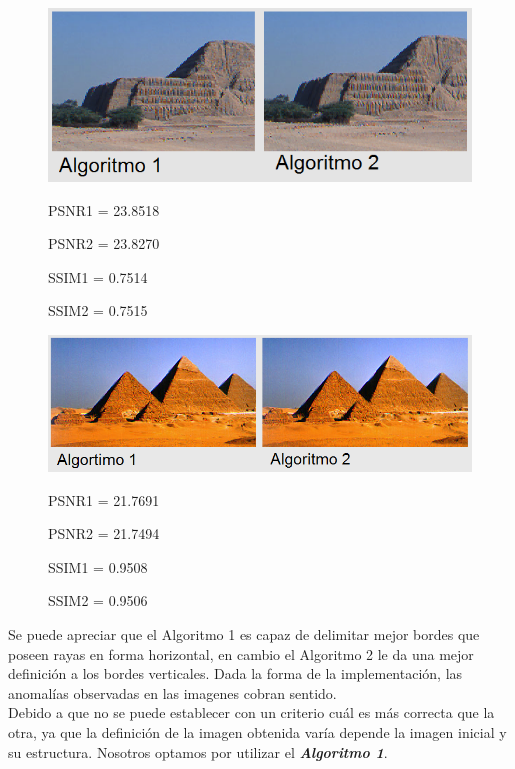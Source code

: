 \documentclass[a4paper]{article}
\begin{document}
\begin{figure}[h!]
	\caption{}
	\begin{center}
	\includegraphics[scale=0.06]{imagenes/Vecino/piramides3cmp}
	\label{Zebra}
	
	PSNR1 =   23.8518

PSNR2 =   23.8270

SSIM1 =    0.7514

SSIM2 =    0.7515
  \end{center}
\end{figure}

\begin{figure}[h!]
	\caption{}
	\begin{center}
	\includegraphics[scale=0.70]{imagenes/Vecino/piramides2cmp}
	\label{Zebra}
	
PSNR1 =   21.7691

PSNR2 =   21.7494

SSIM1 =    0.9508

SSIM2 =    0.9506
  \end{center}
\end{figure}




Se puede apreciar que el Algoritmo 1 es capaz de delimitar mejor bordes que poseen rayas en forma horizontal, en cambio el Algoritmo 2 le da una mejor definici\'on a los bordes verticales. Dada la forma de la implementaci\'on, las anomal\'ias observadas en las imagenes cobran sentido.\\


Debido a que no se puede establecer con un criterio cu\'al es m\'as correcta que la otra, ya que la definición de la imagen obtenida var\'ia depende la imagen inicial y su estructura. Nosotros optamos por utilizar el \emph{\textbf{Algoritmo 1}}.\\
\end{document}
